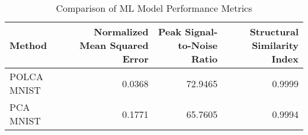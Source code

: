 \begin{table}[htbp]
\caption{Comparison of ML Model Performance Metrics}
\label{tab:model_comparison}
\begin{tabular}{lrrr}
\toprule
Method & Normalized Mean Squared Error & Peak Signal-to-Noise Ratio & Structural Similarity Index \\
\midrule
POLCA MNIST & 0.0368 & 72.9465 & 0.9999 \\
PCA MNIST & 0.1771 & 65.7605 & 0.9994 \\
\bottomrule
\end{tabular}
\end{table}
